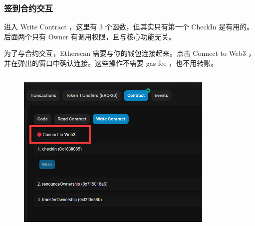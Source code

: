 \documentclass{beamer}
\begin{document}
\begin{frame}
    \frametitle{签到合约交互}

    进入 Write Contract ，这里有 3 个函数，但其实只有第一个 CheckIn 是有用的。后面两个只有 Owner 有调用权限，且与核心功能无关。

    为了与合约交互，Etherscan 需要与你的钱包连接起来。点击 Connect to Web3 ，并在弹出的窗口中确认连接。这些操作不需要 gas fee ，也不用转账。

    \begin{columns}
        \begin{column}{0.6\textwidth}
            \begin{figure}
                \centering
                \includegraphics[width=\textwidth]{s3.png}
            \end{figure}
        \end{column}
        \begin{column}{0.25\textwidth}
            \begin{figure}
                \centering

\end{figure}
\end{column}
\end{columns}
\end{frame}
\end{document}
